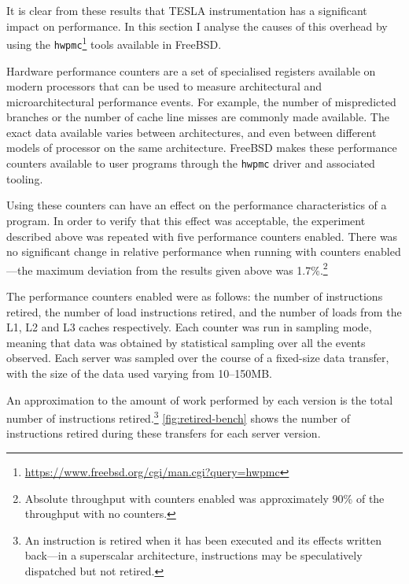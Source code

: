 It is clear from these results that TESLA instrumentation has a
significant impact on performance. In this section I analyse the causes
of this overhead by using the
\texttt{hwpmc}\footnote{\url{https://www.freebsd.org/cgi/man.cgi?query=hwpmc}}
tools available in FreeBSD.

Hardware performance counters are a set of specialised registers
available on modern processors that can be used to measure architectural
and microarchitectural performance events. For example, the number of
mispredicted branches or the number of cache line misses are commonly
made available. The exact data available varies between architectures,
and even between different models of processor on the same architecture.
FreeBSD makes these performance counters available to user programs
through the \texttt{hwpmc} driver and associated tooling.

Using these counters can have an effect on the performance
characteristics of a program. In order to verify that this effect was
acceptable, the experiment described above was repeated with five
performance counters enabled. There was no significant change in
relative performance when running with counters enabled---the maximum
deviation from the results given above was 1.7\%.\footnote{Absolute
throughput with counters enabled was approximately 90\% of the
throughput with no counters.}

The performance counters enabled were as follows: the number of
instructions retired, the number of load instructions retired, and the
number of loads from the L1, L2 and L3 caches respectively. Each counter
was run in sampling mode, meaning that data was obtained by statistical
sampling over all the events observed. Each server was sampled over the
course of a fixed-size data transfer, with the size of the data used
varying from 10--150MB.

An approximation to the amount of work performed by each version is the
total number of instructions retired.\footnote{An instruction is retired
when it has been executed and its effects written back---in a
superscalar architecture, instructions may be speculatively dispatched
but not retired.} \autoref{fig:retired-bench} shows the number of
instructions retired during these transfers for each server version.

